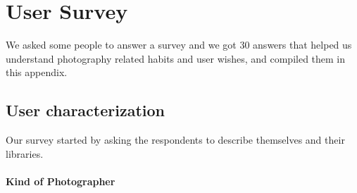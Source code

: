 
\chapter{User Survey}
\label{appendix:usersurvey}

We asked some people to answer a survey and we got 30 answers that helped us understand photography related habits and user wishes, and compiled them in this appendix.

\section{User characterization}

Our survey started by asking the respondents to describe themselves and their libraries.


\subsubsection{Kind of Photographer} %
\label{ssub:subsubsection_name}


